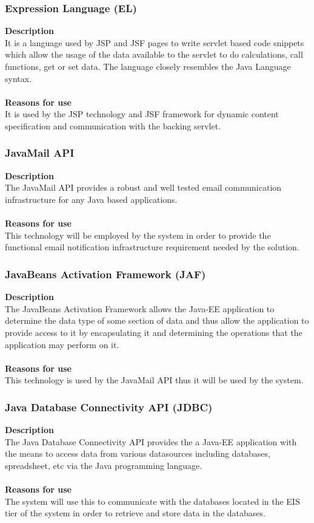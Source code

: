 \documentclass[12pt]{article}
\begin{document}
\subsubsection{Expression Language (EL)}
\textbf{Description}\\
It is a language used by JSP and JSF pages to write servlet based code snippets which allow the usage of the data available to the servlet to do calculations, call functions, get or set data. The language closely resembles the Java Language syntax.\\\\
\textbf{Reasons for use}\\
It is used by the JSP technology and JSF framework for dynamic content specification and communication with the backing servlet.

\subsubsection{JavaMail API}
\textbf{Description}\\
The JavaMail API provides a robust and well tested email communication infrastructure for any Java based applications.\\\\
\textbf{Reasons for use}\\
This technology will be employed by the system in order to provide the functional email notification infrastructure requirement needed by the solution.

\subsubsection{JavaBeans Activation Framework (JAF)}
\textbf{Description}\\
The JavaBeans Activation Framework allows the Java-EE application to determine the data type of some section of data and thus allow the application to provide access to it by encapsulating it and determining the operations that the application may perform on it.\\\\
\textbf{Reasons for use}\\
This technology is used by the JavaMail API thus it will be used by the system. 

\subsubsection{Java Database Connectivity API (JDBC)}
\textbf{Description}\\
The Java Database Connectivity API provides the a Java-EE application with the means to access data from various datasources including databases, spreadsheet, etc via the Java programming language.\\\\
\textbf{Reasons for use}\\
The system will use this to communicate with the databases located in the EIS tier of the system in order to retrieve and store data in the databases. 
\end{document}
